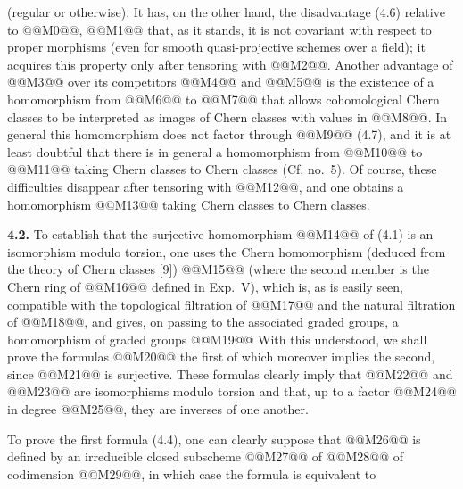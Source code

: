 (regular or otherwise). It has, on the other hand, the disadvantage (4.6) relative to @@M0@@, @@M1@@ that, as it stands, it is not covariant with respect to proper morphisms (even for smooth quasi-projective schemes over a field); it acquires this property only after tensoring with @@M2@@. Another advantage of @@M3@@ over its competitors @@M4@@ and @@M5@@ is the existence of a homomorphism from @@M6@@ to @@M7@@ that allows cohomological Chern classes to be interpreted as images of Chern classes with values in @@M8@@. In general this homomorphism does not factor through @@M9@@ (4.7), and it is at least doubtful that there is in general a homomorphism from @@M10@@ to @@M11@@ taking Chern classes to Chern classes (Cf. no.~5). Of course, these difficulties disappear after tensoring with @@M12@@, and one obtains a homomorphism
@@M13@@
taking Chern classes to Chern classes.

\textbf{4.2.} To establish that the surjective homomorphism @@M14@@ of (4.1) is an isomorphism modulo torsion, one uses the Chern homomorphism (deduced from the theory of Chern classes [9])
@@M15@@
(where the second member is the Chern ring of @@M16@@ defined in Exp.~V), which is, as is easily seen, compatible with the topological filtration of @@M17@@ and the natural filtration of @@M18@@, and gives, on passing to the associated graded groups, a homomorphism of graded groups
@@M19@@
With this understood, we shall prove the formulas
@@M20@@
the first of which moreover implies the second, since @@M21@@ is surjective. These formulas clearly imply that @@M22@@ and @@M23@@ are isomorphisms modulo torsion and that, up to a factor @@M24@@ in degree @@M25@@, they are inverses of one another.

To prove the first formula (4.4), one can clearly suppose that @@M26@@ is defined by an irreducible closed subscheme @@M27@@ of @@M28@@ of codimension @@M29@@, in which case the formula is equivalent to
